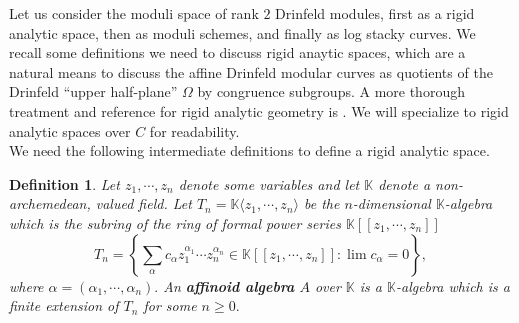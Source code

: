 \documentclass[11pt]{amsart}
\newtheorem{definition}[theorem]{Definition}
\newtheorem{example}[theorem]{Example}
\theoremstyle{definition}
\numberwithin{equation}{section}
\newcommand{\GL}{\mathrm{GL}} 	%
\newcommand{\bbA}{\mathbb{A}}		%
\newcommand{\bbK}{\mathbb{K}}		%
\begin{document}
		Let us consider the moduli space of rank $2$ Drinfeld modules, first as a rigid analytic space, then as moduli schemes, and finally as log stacky curves. We recall some definitions we need to discuss rigid anaytic spaces, which are a natural means to discuss the affine Drinfeld modular curves as quotients of the Drinfeld ``upper half-plane'' $\Omega$ by congruence subgroups. A more thorough treatment and reference for rigid analytic geometry is \cite{Frensel-vanderPut-Rigid-Analytic_Geom}. We will specialize to rigid analytic spaces over $C$ for readability.\\
		
		We need the following intermediate definitions to define a rigid analytic space. 
		\begin{definition}%
			Let $z_1,\cdots, z_n$ denote some variables and let $\bbK$ denote a non-archemedean, valued field. Let $T_n=\bbK\langle z_1,\cdots, z_n\rangle$ be the $n$-dimensional $\bbK$-algebra which is the subring of the ring of formal power series $\bbK[\![z_1,\cdots, z_n]\!]$ 
			\[T_n=\left\{\sum_{\alpha} c_{\alpha}z_1^{\alpha_1}\cdots z_n^{\alpha_n}\in \bbK[\![z_1,\cdots, z_n]\!] :\lim c_{\alpha}=0\right\},\] 
			where $\alpha = (\alpha_1,\cdots,\alpha_n).$ An \textbf{affinoid algebra} $A$ over $\bbK$ is a $\bbK$-algebra which is a finite extension of $T_n$ for some $n\geq 0.$
		\end{definition} 
		
\end{document}
